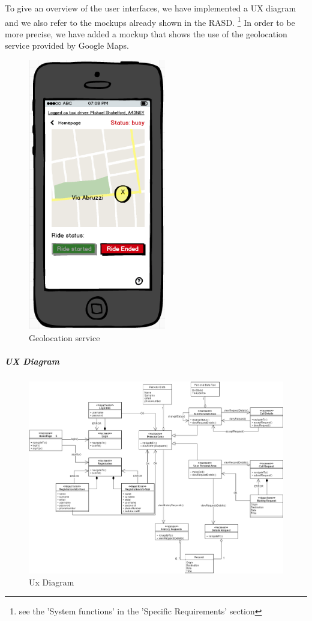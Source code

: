 To give an overview of the user interfaces, we have implemented a UX diagram and we also refer to the mockups already shown in the RASD.
\footnote{see the 'System functions' in the 'Specific Requirements' section}
\newline
In order to be more precise, we have added a mockup that shows the use of the geolocation service provided by Google Maps.    
\newline
\begin{figure}[H]
    \centering
    \includegraphics[width=6cm]{./Images/GoogleMaps.png}
    \caption{Geolocation service}
\end{figure}
\newpage
\subparagraph{UX Diagram}
    \begin{figure}[H]
        \centering
        \includegraphics[width=17cm, angle=90]{./Images/UX_Diagram.png}
        \caption{Ux Diagram}
    \end{figure}
